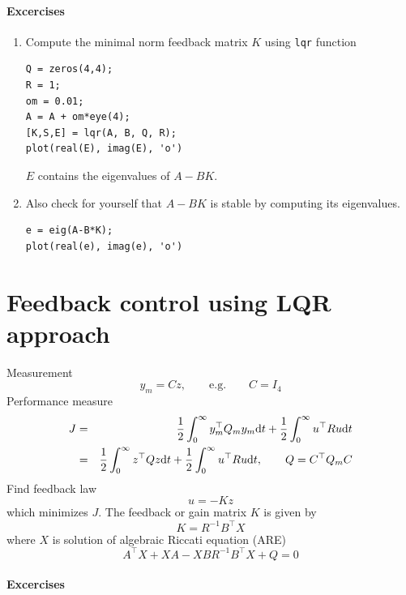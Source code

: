 \documentclass[12pt]{article}
\begin{document}
\paragraph{Excercises}

\begin{enumerate}

\item Compute the minimal norm feedback matrix $K$ using {\tt lqr} function
\begin{lstlisting}
Q = zeros(4,4);
R = 1;
om = 0.01;
A = A + om*eye(4);
[K,S,E] = lqr(A, B, Q, R);
plot(real(E), imag(E), 'o')
\end{lstlisting}
$E$ contains the eigenvalues of $A - B K$.

\item Also check for yourself that $A-BK$ is stable by computing its eigenvalues.
\begin{lstlisting}
e = eig(A-B*K);
plot(real(e), imag(e), 'o')
\end{lstlisting}

\end{enumerate}


\section{Feedback control using LQR approach}
Measurement
\[
y_m = C z, \qquad \textrm{e.g.} \qquad C = I_4
\]
Performance measure
\begin{eqnarray*}
J &=& \frac{1}{2}\int_0^\infty y_m^\top Q_m y_m \textrm{d} t + \frac{1}{2} \int_0^\infty u^\top R 
u \textrm{d} t \\
&=& \frac{1}{2}\int_0^\infty z^\top Q z \textrm{d} t + \frac{1}{2} \int_0^\infty u^\top R u \textrm{d}   
t , \qquad Q = C^\top Q_m C
\end{eqnarray*}
Find feedback law
\[
u = -K z
\]
which minimizes $J$. The feedback or gain matrix $K$ is given by
\[
K = R^{-1} B^\top X
\]
where $X$ is solution of algebraic Riccati equation (ARE)
\[
A^\top X + X A - X B R^{-1} B^\top X + Q = 0
\]

\paragraph{Excercises}
\end{document}
